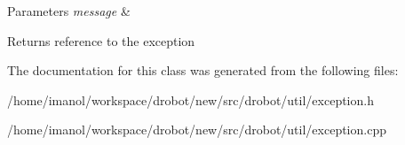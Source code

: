 \begin{DoxyParams}{Parameters}
{\em message} & \\
\hline
\end{DoxyParams}
\begin{DoxyReturn}{Returns}
reference to the exception 
\end{DoxyReturn}


The documentation for this class was generated from the following files\-:\begin{DoxyCompactItemize}
\item 
/home/imanol/workspace/drobot/new/src/drobot/util/exception.\-h\item 
/home/imanol/workspace/drobot/new/src/drobot/util/exception.\-cpp\end{DoxyCompactItemize}
